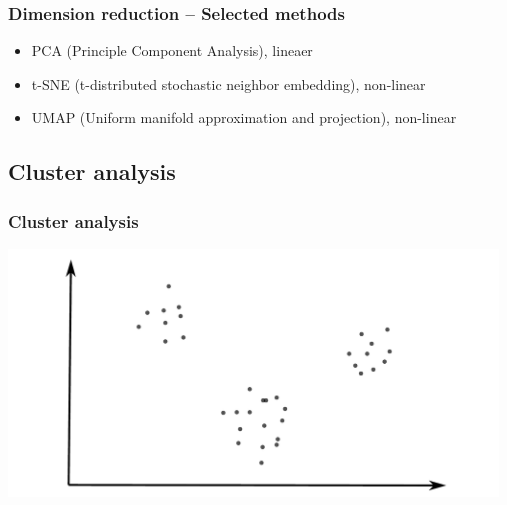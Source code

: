 \documentclass[aspectratio=169]{beamer}
\begin{document}
\begin{frame}
  \frametitle{Dimension reduction -- Selected methods}
  \begin{block}{}
    \begin{center}
      \begin{itemize}
      \item PCA (Principle Component Analysis), lineaer
      \item t-SNE (t-distributed stochastic neighbor embedding), non-linear
      \item UMAP (Uniform manifold approximation and projection), non-linear
      \end{itemize}
    \end{center}
  \end{block}
\end{frame}

\subsection{Cluster analysis}

\setcounter{tocdepth}{2}
\begin{frame}{}
   \tableofcontents[currentsubsection,hideothersubsections,
     subsectionstyle=show/shaded]
\end{frame}

\begin{frame}
  \frametitle{Cluster analysis}
  \begin{center}
    \includegraphics[width=13.0cm]{images/clustering_1.pdf}
  \end{center}  
\end{frame}
\end{document}
